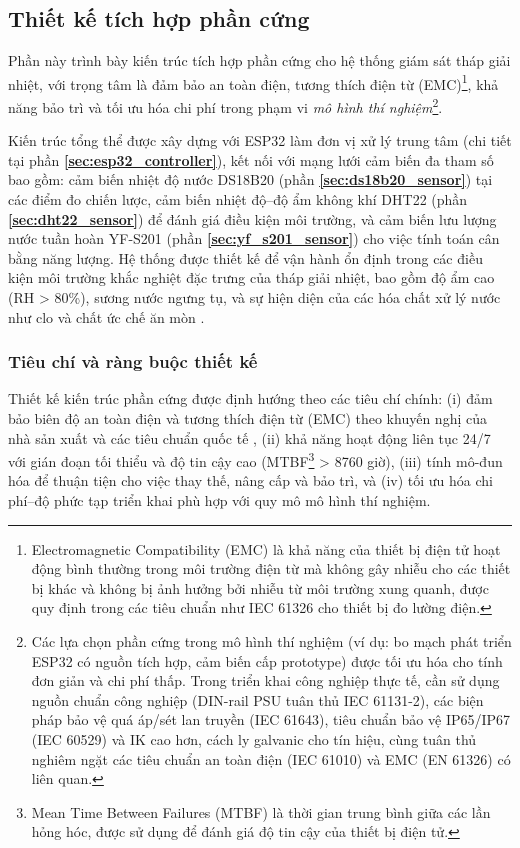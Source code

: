 \documentclass[../main.tex]{subfiles}
\begin{document}
\subsection{Thiết kế tích hợp phần cứng}
\label{sec:hardware_integration}

Phần này trình bày kiến trúc tích hợp phần cứng cho hệ thống giám sát tháp giải nhiệt, với trọng tâm là đảm bảo an toàn điện, tương thích điện từ (EMC)\footnote{Electromagnetic Compatibility (EMC) là khả năng của thiết bị điện tử hoạt động bình thường trong môi trường điện từ mà không gây nhiễu cho các thiết bị khác và không bị ảnh hưởng bởi nhiễu từ môi trường xung quanh, được quy định trong các tiêu chuẩn như IEC 61326 cho thiết bị đo lường điện.}, khả năng bảo trì và tối ưu hóa chi phí trong phạm vi \textit{mô hình thí nghiệm}\footnote{Các lựa chọn phần cứng trong mô hình thí nghiệm (ví dụ: bo mạch phát triển ESP32 có nguồn tích hợp, cảm biến cấp prototype) được tối ưu hóa cho tính đơn giản và chi phí thấp. Trong triển khai công nghiệp thực tế, cần sử dụng nguồn chuẩn công nghiệp (DIN-rail PSU tuân thủ IEC 61131-2), các biện pháp bảo vệ quá áp/sét lan truyền (IEC 61643), tiêu chuẩn bảo vệ IP65/IP67 (IEC 60529) và IK cao hơn, cách ly galvanic cho tín hiệu, cùng tuân thủ nghiêm ngặt các tiêu chuẩn an toàn điện (IEC 61010) và EMC (EN 61326) có liên quan.}. 

Kiến trúc tổng thể được xây dựng với ESP32 làm đơn vị xử lý trung tâm (chi tiết tại phần \textbf{\ref{sec:esp32_controller}}), kết nối với mạng lưới cảm biến đa tham số bao gồm: cảm biến nhiệt độ nước DS18B20 (phần \textbf{\ref{sec:ds18b20_sensor}}) tại các điểm đo chiến lược, cảm biến nhiệt độ--độ ẩm không khí DHT22 (phần \textbf{\ref{sec:dht22_sensor}}) để đánh giá điều kiện môi trường, và cảm biến lưu lượng nước tuần hoàn YF-S201 (phần \textbf{\ref{sec:yf_s201_sensor}}) cho việc tính toán cân bằng năng lượng. Hệ thống được thiết kế để vận hành ổn định trong các điều kiện môi trường khắc nghiệt đặc trưng của tháp giải nhiệt, bao gồm độ ẩm cao (RH > 80\%), sương nước ngưng tụ, và sự hiện diện của các hóa chất xử lý nước như clo và chất ức chế ăn mòn \cite{Espressif_ESP32_technical_reference,epa_watersense_cooling_towers_2012,ashrae2020cooling}.

\subsubsection{Tiêu chí và ràng buộc thiết kế}
Thiết kế kiến trúc phần cứng được định hướng theo các tiêu chí chính: (i) đảm bảo biên độ an toàn điện và tương thích điện từ (EMC) theo khuyến nghị của nhà sản xuất và các tiêu chuẩn quốc tế \cite{Espressif_ESP32_technical_reference}, (ii) khả năng hoạt động liên tục 24/7 với gián đoạn tối thiểu và độ tin cậy cao (MTBF\footnote{Mean Time Between Failures (MTBF) là thời gian trung bình giữa các lần hỏng hóc, được sử dụng để đánh giá độ tin cậy của thiết bị điện tử.} > 8760 giờ), (iii) tính mô-đun hóa để thuận tiện cho việc thay thế, nâng cấp và bảo trì, và (iv) tối ưu hóa chi phí--độ phức tạp triển khai phù hợp với quy mô mô hình thí nghiệm. 
\end{document}
